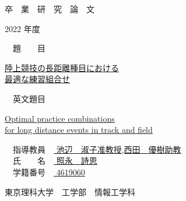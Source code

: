\documentclass[12pt,fleqn]{jreport}
\begin{document}
\thispagestyle{empty}
\begin{center}
  {\Huge 卒　業　研　究　論　文}
\end{center}
\vspace{2cm}
\begin{center}
  {\huge 2022 年度}
\end{center}
\vspace{2cm}
\begin{flushleft}
  {\LARGE　題　　目　}
\end{flushleft}
\begin{center}
  {\LARGE \underline{陸上競技の長距離種目における}\\
    \vspace{0.2cm}
    \underline{最適な練習組合せ}}\\
\end{center}
\vspace{0.5cm}
\begin{flushleft}
  {\LARGE　英文題目　}
\end{flushleft}
\begin{center}
  {\LARGE \underline{Optimal practice combinations }\\
    \vspace{0.2cm}
    \underline{for long distance events in track and field}
  }\\
\end{center}
\vspace{3cm}
\begin{flushleft}
  {\Large　指導教員　\underline{ 池辺　淑子准教授,西田　優樹助教 }}\\
  \vspace{5mm}
  {\Large　氏　　名　\underline{ 照永　詩恩  }}\\
  \vspace{5mm}
  {\Large　学籍番号　\underline{ 4619060 }}
\end{flushleft}
\vspace{1.5cm}
\begin{flushright}
  {\Large 東京理科大学　工学部　情報工学科}\\
\end{flushright}
\newpage
\thispagestyle{empty}
\end{document}

